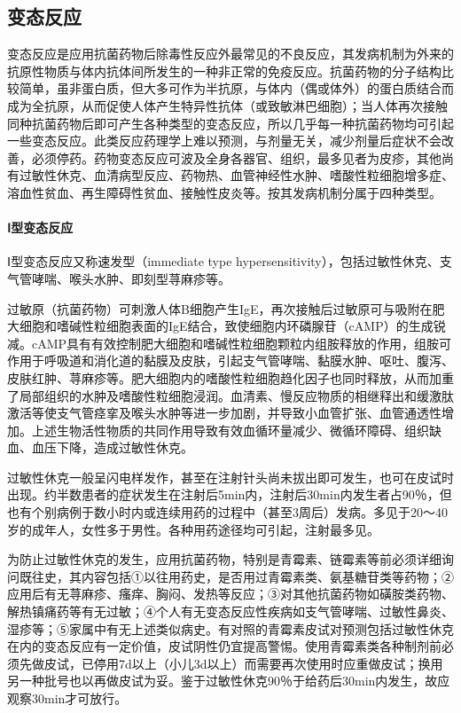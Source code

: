 \subsection{变态反应}

变态反应是应用抗菌药物后除毒性反应外最常见的不良反应，其发病机制为外来的抗原性物质与体内抗体间所发生的一种非正常的免疫反应。抗菌药物的分子结构比较简单，虽非蛋白质，但大多可作为半抗原，与体内（偶或体外）的蛋白质结合而成为全抗原，从而促使人体产生特异性抗体（或致敏淋巴细胞）；当人体再次接触同种抗菌药物后即可产生各种类型的变态反应，所以几乎每一种抗菌药物均可引起一些变态反应。此类反应药理学上难以预测，与剂量无关，减少剂量后症状不会改善，必须停药。药物变态反应可波及全身各器官、组织，最多见者为皮疹，其他尚有过敏性休克、血清病型反应、药物热、血管神经性水肿、嗜酸性粒细胞增多症、溶血性贫血、再生障碍性贫血、接触性皮炎等。按其发病机制分属于四种类型。
\paragraph{Ⅰ型变态反应}

Ⅰ型变态反应又称速发型（immediate type
hypersensitivity），包括过敏性休克、支气管哮喘、喉头水肿、即刻型荨麻疹等。

过敏原（抗菌药物）可刺激人体B细胞产生IgE，再次接触后过敏原可与吸附在肥大细胞和嗜碱性粒细胞表面的IgE结合，致使细胞内环磷腺苷（cAMP）的生成锐减。cAMP具有有效控制肥大细胞和嗜碱性粒细胞颗粒内组胺释放的作用，组胺可作用于呼吸道和消化道的黏膜及皮肤，引起支气管哮喘、黏膜水肿、呕吐、腹泻、皮肤红肿、荨麻疹等。肥大细胞内的嗜酸性粒细胞趋化因子也同时释放，从而加重了局部组织的水肿及嗜酸性粒细胞浸润。血清素、慢反应物质的相继释出和缓激肽激活等使支气管痉挛及喉头水肿等进一步加剧，并导致小血管扩张、血管通透性增加。上述生物活性物质的共同作用导致有效血循环量减少、微循环障碍、组织缺血、血压下降，造成过敏性休克。

过敏性休克一般呈闪电样发作，甚至在注射针头尚未拔出即可发生，也可在皮试时出现。约半数患者的症状发生在注射后5min内，注射后30min内发生者占90％，但也有个别病例于数小时内或连续用药的过程中（甚至3周后）发病。多见于20～40岁的成年人，女性多于男性。各种用药途径均可引起，注射最多见。

为防止过敏性休克的发生，应用抗菌药物，特别是青霉素、链霉素等前必须详细询问既往史，其内容包括①以往用药史，是否用过青霉素类、氨基糖苷类等药物；②应用后有无荨麻疹、瘙痒、胸闷、发热等反应；③对其他抗菌药物如磺胺类药物、解热镇痛药等有无过敏；④个人有无变态反应性疾病如支气管哮喘、过敏性鼻炎、湿疹等；⑤家属中有无上述类似病史。有对照的青霉素皮试对预测包括过敏性休克在内的变态反应有一定价值，皮试阴性仍宜提高警惕。使用青霉素类各种制剂前必须先做皮试，已停用7d以上（小儿3d以上）而需要再次使用时应重做皮试；换用另一种批号也以再做皮试为妥。鉴于过敏性休克90％于给药后30min内发生，故应观察30min才可放行。

